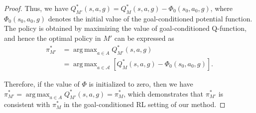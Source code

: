 \documentclass[journal]{IEEEtran}
\DeclareMathOperator*{\argmax}{arg\,max}
\begin{document}
\begin{proof}
Thus, we have $Q^{*}_{M'}(s,a,g) = Q^{*}_{M}(s,a,g) - \Phi_0(s_0,a_0,g)$, where $\Phi_0(s_0,a_0,g)$ denotes the initial value of the goal-conditioned potential function.
The policy is obtained by maximizing the value of goal-conditioned Q-function, and hence the optimal policy in $M'$ can be expressed as
\begin{align}
     \pi_{M'}^{*} &= \argmax_{a\in A} Q_{M'}^{*}(s,a,g) \nonumber\\
     &= \argmax_{a\in \mathcal{A}} \left[Q_{M}^{*}(s,a,g) - \Phi_0(s_0,a_0,g) \right].
\end{align}

Therefore, if the value of $\Phi$ is initialized to zero, then we have $\pi_{M'}^{*} = \argmax_{a\in A} Q_{M'}^{*}(s,a,g) = \pi_{M}^{*}$, which demonstrates that $\pi_{M'}^{*}$ is consistent with $\pi_{M}^{*}$ in the goal-conditioned RL setting of our method.
\end{proof}



\footnotesize


\end{document}
